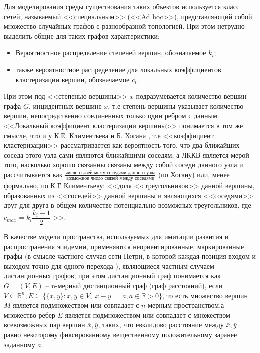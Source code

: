 Для моделирования среды существования таких объектов используется класс сетей, называемый <<специальным>> (<<Ad hoc>>), представляющий собой множество случайных графов с разнообразной топологией. При этом нетрудно выделить общие для таких графов характеристики: 
\begin{itemize}
	\item Вероятностное распределение степеней вершин, обозначаемое $k_i$;
	\item также вероятностное распределение для локальных коэффициентов кластеризации вершин, обозначаемое $c_i$.
\end{itemize}
При этом под <<степенью вершины>> 	$x$ подразумевается количество вершин графа $G$, инцидентных вершине $x$, т.е степень вершины указывает количество вершин, непосредственно соединенных только один ребром с данным. %
<<Локальный 	коэффициент кластеризации вершины>> понимается в том же смысле, что и у К.Е. Климентьева и Б. Хогана %
, т.е <<коэффициент кластеризации>> рассматривается как вероятность того, что два ближайших соседа этого узла сами являются ближайшими соседям, а ЛККВ является мерой того, насколько хорошо связанны связаны между собой соседи данного узла и рассчитывается как \newline
$ \frac{\text{число связей межу соседями данного узла}}{\text{возможное число связей между соседями}} $ (по Хогану) или, менее формально, по К.Е Климентьеву: <<доля <<треугольников>> данной вершины, образованных из <<соседей>> данной вершины и являющихся <<соседями>> друг для друга в общем количестве потенциально возможных треугольников, где $c_{max}=k_i\dfrac{k_i-1}{2}$ >>.


В качестве модели пространства, используемых для имитации развития и распространения эпидемии, применяются неориентированные, маркированные графы (в смысле частного случая сети Петри, в которой каждая позиция входом и выходом точно для одного перехода %
), являющиеся частным случаем дистанционных графов, при этом дистанционный граф понимается как $G = (V,E)$ -- n-мерный дистанционный граф  (граф расстояний), если $V \subseteq \mathbb{R}^n, E \subseteq \{\{\overline{x}, \overline{y} \}: \overline{x}, \overline{y} \in V, |\overline{x} - \overline{y}| = a, a \in \mathbb{R} > 0 \}$, то есть множество вершин $M$ является подмножеством или совпадает с  $n$-мерным пространством,а множество ребер $E$ является подмножеством или совпадает с множеством всевозможных пар вершин $\overline{x}, \overline{y}$, таких, что  евклидово расстояние между $\overline{x}, \overline{y}$ равно некоторому фиксированному вещественному положительному заранее заданному $a$. 

